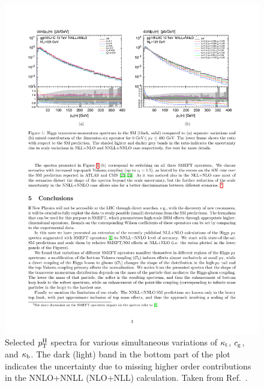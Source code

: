 

\begin{figure}[hbtp]
  \begin{center}
    \includegraphics[width=0.6\linewidth]{img/theory/ktcgkb_variations.pdf}
    \caption{
        Selected $p_\mathrm{T}^\mathrm{H}$ spectra for various simultaneous variations of $\kappa_{\mathrm{t}}$, $c_\mathrm{g}$, and $\kappa_{\mathrm{b}}$.
        The dark (light) band in the bottom part of the plot indicates the uncertainty due to missing higher order contributions in the NNLO+NNLL (NLO+NLL) calculation.
        Taken from Ref.~\cite{Grazzini:2017szg}.
        }
    \label{fig:ktcgkb-precomputed}
  \end{center}
\end{figure}


